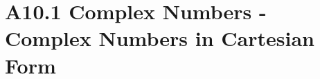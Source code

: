 \chapter{A10.1 Complex Numbers - Complex Numbers in Cartesian Form}\label{sec:A10.1}


\clearpage

\clearpage
